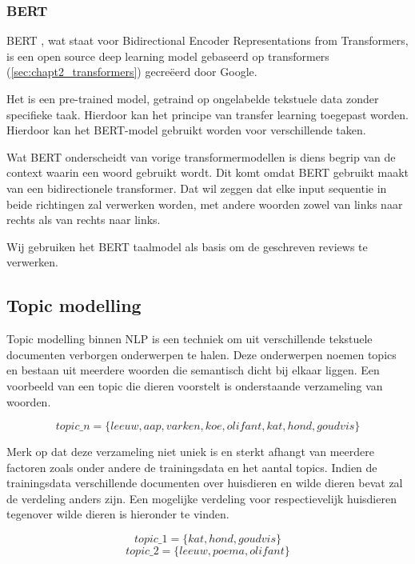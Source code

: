 
\subsubsection{BERT}
\label{sec:chapt2_bert}
BERT \cite{BERT_paper}, wat staat voor Bidirectional Encoder Representations from Transformers, is een open source deep learning model gebaseerd op transformers (\ref{sec:chapt2_transformers}) gecreëerd door Google.

Het is een pre-trained model, getraind op ongelabelde tekstuele data zonder specifieke taak. Hierdoor kan het principe van transfer learning toegepast worden. Hierdoor kan het BERT-model gebruikt worden voor verschillende taken.

Wat BERT onderscheidt \cite{bert_llm_basic} van vorige transformermodellen is diens begrip van de context waarin een woord gebruikt wordt. Dit komt omdat BERT gebruikt maakt van een bidirectionele transformer.  Dat wil zeggen dat elke input sequentie in beide richtingen zal verwerken worden, met andere woorden zowel van links naar rechts als van rechts naar links.

Wij gebruiken het BERT taalmodel als basis om de geschreven reviews te verwerken.

\subsection{Topic modelling}

Topic modelling binnen NLP is een techniek om uit verschillende tekstuele documenten verborgen onderwerpen te halen. Deze onderwerpen noemen topics en bestaan uit meerdere woorden die semantisch dicht bij elkaar liggen. Een voorbeeld van een topic die dieren voorstelt is onderstaande verzameling van woorden.

\[
topic\_n = \{leeuw, aap, varken, koe, olifant, kat, hond, goudvis\}
\]

Merk op dat deze verzameling niet uniek is en sterkt afhangt van meerdere factoren zoals onder andere de trainingsdata en het aantal topics. Indien de trainingsdata verschillende documenten over huisdieren en wilde dieren bevat zal de verdeling anders zijn. Een mogelijke verdeling voor respectievelijk huisdieren tegenover wilde dieren is hieronder te vinden.

\[
topic\_1 = \{kat, hond, goudvis\}
\]
\[
topic\_2 =\{leeuw, poema, olifant\}
\]

